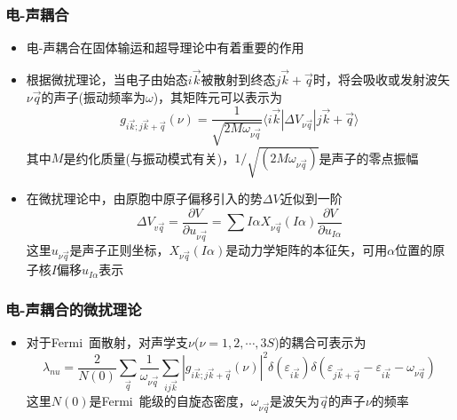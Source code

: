 \documentclass[cjk,slidestop,compress,mathserif,blue]{beamer}
\begin{document}
\frame
{
	\frametitle{电-声耦合}
	\begin{itemize}
		\item 电-声耦合在固体输运和超导理论中有着重要的作用
		\item 根据微扰理论，当电子由始态$i\vec k$被散射到终态$j\vec k+\vec q$时，将会吸收或发射波矢$\nu\vec q$的声子(振动频率为$\omega$)，其矩阵元可以表示为
			\begin{displaymath}
				g_{i\vec k;j\vec k+\vec q}(\nu)=\frac1{\sqrt{2M\omega_{\nu\vec q}}}\langle i\vec k|\Delta V_{\nu\vec q}|j\vec k+\vec q\rangle
			\end{displaymath}
			其中$M$是约化质量(与振动模式有关)，$1/\sqrt{(2M\omega_{\nu\vec q})}$是声子的零点振幅
		\item 在微扰理论中，由原胞中原子偏移引入的势$\Delta V$近似到一阶
			\begin{displaymath}
				\Delta V_{v\vec q}=\frac{\partial V}{\partial u_{\nu\vec q}}=\sum{I\alpha}X_{\nu\vec q}(I\alpha)\frac{\partial V}{\partial u_{I\alpha}} 
			\end{displaymath}
			这里$u_{\nu\vec q}$是声子正则坐标，$X_{\nu\vec q}(I\alpha)$是动力学矩阵的本征矢，可用$\alpha$位置的原子核$I$偏移$u_{I\alpha}$表示
	\end{itemize}
}

\frame
{
	\frametitle{电-声耦合的微扰理论}
	\begin{itemize}
		\item 对于\textrm{Fermi~}面散射，对声学支$\nu$($\nu=1,2,\cdots,3S$)的耦合可表示为
			\begin{displaymath}
				\lambda_{nu}=\frac2{N(0)}\sum_{\vec q}\frac1{\omega_{\nu\vec q}}\sum_{ij\vec k}|g_{i\vec k;j\vec k+\vec q}(\nu)|^2\delta(\varepsilon_{i\vec k})\delta(\varepsilon_{j\vec k+\vec q}-\varepsilon_{i\vec k}-\omega_{\nu\vec q})
			\end{displaymath}
			这里$N(0)$是\textrm{Fermi~}能级的自旋态密度，$\omega_{\nu\vec q}$是波矢为$\vec q$的声子$\nu$的频率
	\end{itemize}
}
\end{document}
